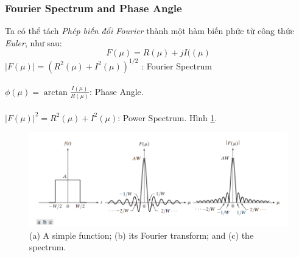 \documentclass{article}
\begin{document}
        \subsubsection{Fourier Spectrum and Phase Angle}
        Ta có thể tách \textit{Phép biến đổi Fourier} thành một hàm biến phức từ công thức \textit{Euler}, như sau:
        $$ F(\mu) = R(\mu) + jI((\mu)$$
        $|F(\mu)| = \left(R^{2}(\mu)+I^{2}(\mu)\right)^{1/2}$ : Fourier Spectrum\\ \\
        $\phi(\mu) = \arctan \frac{I(\mu)}{R(\mu)}$: Phase Angle.
        \\ \\
         $|F(\mu)|^2 = R^{2}(\mu)+I^{2}(\mu)$: Power Spectrum. Hình \ref{fig3}.
        \begin{figure}[ht!]
        \centering
        \includegraphics[width = \linewidth]{fo1.png}
        \caption{(a) A simple function; (b) its Fourier transform; and (c) the spectrum.}
        \label{fig3}
        \end{figure}
\end{document}
